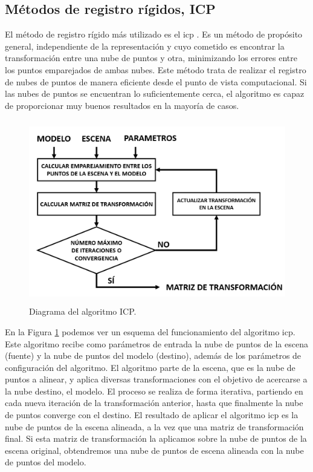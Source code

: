 \subsection{Métodos de registro rígidos, ICP}

El método de registro rígido más utilizado es el \gls{icp} \cite{Besl1992}. Es un método de propósito general, independiente de la representación y cuyo cometido es encontrar la transformación entre una nube de puntos y otra, minimizando los errores entre los puntos emparejados de ambas nubes.
Este método trata de realizar el registro de nubes de puntos de manera eficiente desde el punto de vista computacional.
Si las nubes de puntos se encuentran lo suficientemente cerca, el algoritmo es capaz de proporcionar  muy buenos resultados en la mayoría de casos.

\begin{figure}[h]
    \centering
    \includegraphics[height=8cm]{archivos/esquema-algoritmo-icp.png}
    \caption{Diagrama del algoritmo ICP.}
    \label{fig:esquema-algoritmo-icp}
\end{figure}

En la Figura \ref{fig:esquema-algoritmo-icp} podemos ver un esquema del funcionamiento del algoritmo \gls{icp}.
Este algoritmo recibe como parámetros de entrada la nube de puntos de la escena (fuente) y la nube de puntos del modelo (destino), además de los parámetros de configuración del algoritmo.
El algoritmo parte de la escena, que es la nube de puntos a alinear, y aplica diversas transformaciones con el objetivo de acercarse a la nube destino, el modelo.
El proceso se realiza de forma iterativa, partiendo en cada nueva iteración de la transformación anterior, hasta que finalmente la nube de puntos converge con el destino.
El resultado de aplicar el algoritmo \gls{icp} es la nube de puntos de la escena alineada, a la vez que una matriz de transformación final.
Si esta matriz de transformación la aplicamos sobre la nube de puntos de la escena original, obtendremos una nube de puntos de escena alineada con la nube de puntos del modelo.

